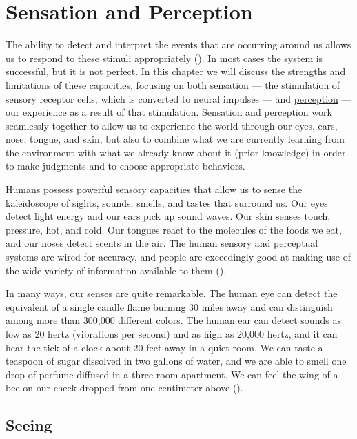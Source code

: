 \documentclass[
]{krantz}
\begin{document}
\section{Sensation and Perception}\label{sensation-and-perception}

The ability to detect and interpret the events that are occurring around us allows us to respond to these stimuli appropriately (). In most cases the system is successful, but it is not perfect. In this chapter we will discuss the strengths and limitations of these capacities, focusing on both \hyperref[sensation]{sensation} --- the stimulation of sensory receptor cells, which is converted to neural impulses --- and \hyperref[perception]{perception} --- our experience as a result of that stimulation. Sensation and perception work seamlessly together to allow us to experience the world through our eyes, ears, nose, tongue, and skin, but also to combine what we are currently learning from the environment with what we already know about it (prior knowledge) in order to make judgments and to choose appropriate behaviors.

Humans possess powerful sensory capacities that allow us to sense the kaleidoscope of sights, sounds, smells, and tastes that surround us. Our eyes detect light energy and our ears pick up sound waves. Our skin senses touch, pressure, hot, and cold. Our tongues react to the molecules of the foods we eat, and our noses detect scents in the air. The human sensory and perceptual systems are wired for accuracy, and people are exceedingly good at making use of the wide variety of information available to them ().

In many ways, our senses are quite remarkable. The human eye can detect the equivalent of a single candle flame burning 30 miles away and can distinguish among more than 300,000 different colors. The human ear can detect sounds as low as 20 hertz (vibrations per second) and as high as 20,000 hertz, and it can hear the tick of a clock about 20 feet away in a quiet room. We can taste a teaspoon of sugar dissolved in two gallons of water, and we are able to smell one drop of perfume diffused in a three-room apartment. We can feel the wing of a bee on our cheek dropped from one centimeter above ().

\subsection*{Seeing}\label{seeing}
\end{document}
